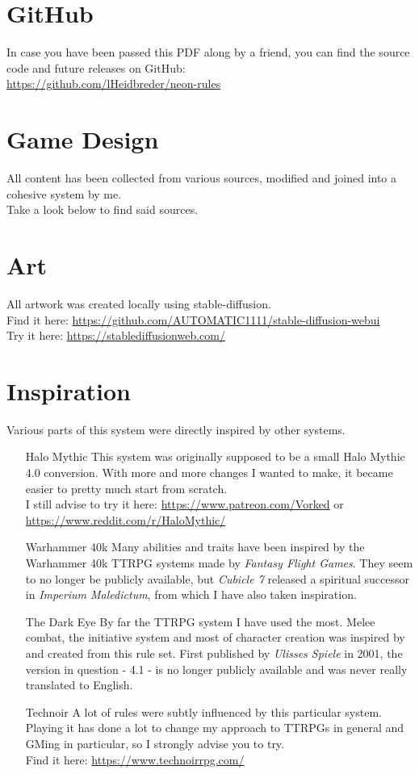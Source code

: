 \section*{GitHub}
In case you have been passed this PDF along by a friend, you can find the source code and future releases on GitHub:\\
	\url{https://github.com/lHeidbreder/neon-rules}

\section*{Game Design}
All content has been collected from various sources, modified and joined into a cohesive system by me.\\
Take a look below to find said sources.

\section*{Art}
All artwork was created locally using stable-diffusion.\\
Find it here: \url{https://github.com/AUTOMATIC1111/stable-diffusion-webui}\\
Try it here: \url{https://stablediffusionweb.com/}

\section*{Inspiration}
Various parts of this system were directly inspired by other systems.
\begin{enumerate}
	\item[Halo Mythic] This system was originally supposed to be a small Halo Mythic 4.0 conversion. With more and more changes I wanted to make, it became easier to pretty much start from scratch.\\
		I still advise to try it here:
		\url{https://www.patreon.com/Vorked} or \url{https://www.reddit.com/r/HaloMythic/}
	\item[Warhammer 40k] Many abilities and traits have been inspired by the Warhammer 40k TTRPG systems made by \emph{Fantasy Flight Games}.
	They seem to no longer be publicly available, but \emph{Cubicle 7} released a spiritual successor in \emph{Imperium Maledictum}, from which I have also taken inspiration.
	\item[The Dark Eye] By far the TTRPG system I have used the most. Melee combat, the initiative system and most of character creation was inspired by and created from this rule set.
	First published by \emph{Ulisses Spiele} in 2001, the version in question - 4.1 - is no longer publicly available and was never really translated to English.
	\item[Technoir] A lot of rules were subtly influenced by this particular system. Playing it has done a lot to change my approach to TTRPGs in general and GMing in particular, so I strongly advise you to try.\\
		Find it here: \url{https://www.technoirrpg.com/}
\end{enumerate}


